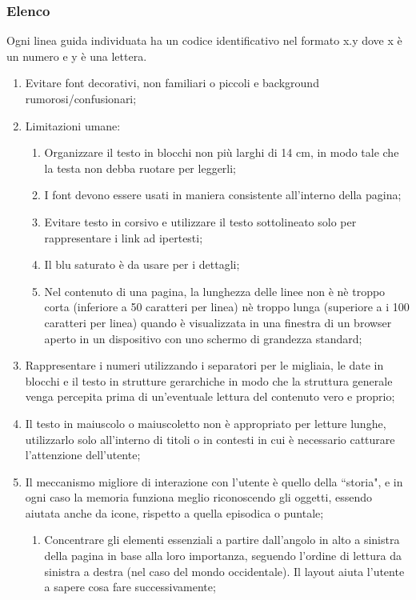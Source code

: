 \subsubsection{Elenco}
\label{sss:elenco}
Ogni linea guida individuata ha un codice identificativo nel formato x.y dove x è un numero e y è una lettera.
\begin{enumerate}
    \item Evitare font decorativi, non familiari o piccoli e background rumorosi/confusionari; \label{lg:1}
    \item Limitazioni umane:\label{lg:2} 
    \begin{enumerate}[label=\alph*.]
        \item Organizzare il testo in blocchi non più larghi di 14 cm, in modo tale che la testa non debba ruotare per leggerli;
        \item I font devono essere usati in maniera consistente all'interno della pagina;
        \item Evitare testo in corsivo e utilizzare il testo sottolineato solo per rappresentare i link ad ipertesti;\label{lg:2.c}
        \item Il blu saturato è da usare per i dettagli;
        \item Nel contenuto di una pagina, la lunghezza delle linee non è nè troppo corta (inferiore a 50 caratteri per linea) nè troppo lunga (superiore a i 100 caratteri per linea) quando è visualizzata in una finestra di un browser aperto in un dispositivo con uno schermo di grandezza standard;\label{lg:2.e}
    \end{enumerate}
    \item Rappresentare i numeri utilizzando i separatori per le migliaia, le date in blocchi e il testo in strutture gerarchiche in modo che la struttura generale venga percepita prima di un'eventuale lettura del contenuto vero e proprio;\label{lg:3}
    \item Il testo in maiuscolo o maiuscoletto non è appropriato per letture lunghe, utilizzarlo solo all'interno di titoli o in contesti in cui è necessario catturare l'attenzione dell'utente;\label{lg:4}
    \item Il meccanismo migliore di interazione con l'utente è quello della ``storia", e in ogni caso la memoria funziona meglio riconoscendo gli oggetti, essendo aiutata anche da icone, rispetto a quella episodica o puntale;\label{lg:5}
    \begin{enumerate}[label=\alph*.]
        \item Concentrare gli elementi essenziali a partire dall'angolo in alto a sinistra della pagina in base alla loro importanza, seguendo l'ordine di lettura da sinistra a destra (nel caso del mondo occidentale). Il layout aiuta l'utente a sapere cosa fare successivamente;

\end{enumerate}
\end{enumerate}
